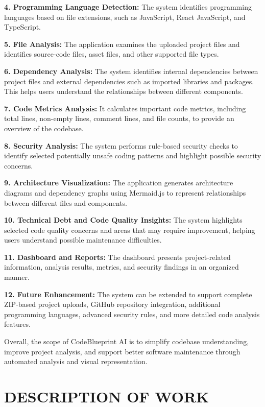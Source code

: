 \documentclass[0pt, a4 paper]{report}
\begin{document}
\begin{center}
{\justify \textbf{4. Programming Language Detection:} The system identifies programming languages based on file extensions, such as JavaScript, React JavaScript, and TypeScript.

\justify \textbf{5. File Analysis:} The application examines the uploaded project files and identifies source-code files, asset files, and other supported file types.

\justify \textbf{6. Dependency Analysis:} The system identifies internal dependencies between project files and external dependencies such as imported libraries and packages. This helps users understand the relationships between different components.

\justify \textbf{7. Code Metrics Analysis:} It calculates important code metrics, including total lines, non-empty lines, comment lines, and file counts, to provide an overview of the codebase.

\justify \textbf{8. Security Analysis:} The system performs rule-based security checks to identify selected potentially unsafe coding patterns and highlight possible security concerns.

\justify \textbf{9. Architecture Visualization:} The application generates architecture diagrams and dependency graphs using Mermaid.js to represent relationships between different files and components.

\justify \textbf{10. Technical Debt and Code Quality Insights:} The system highlights selected code quality concerns and areas that may require improvement, helping users understand possible maintenance difficulties.


\justify \textbf{11. Dashboard and Reports:} The dashboard presents project-related information, analysis results, metrics, and security findings in an organized manner.

\justify \textbf{12. Future Enhancement:} The system can be extended to support complete ZIP-based project uploads, GitHub repository integration, additional programming languages, advanced security rules, and more detailed code analysis features.

\justify Overall, the scope of CodeBlueprint AI is to simplify codebase understanding, improve project analysis, and support better software maintenance through automated analysis and visual representation.

\newpage
\chapter{DESCRIPTION OF WORK}

}
\end{center}
\end{document}
